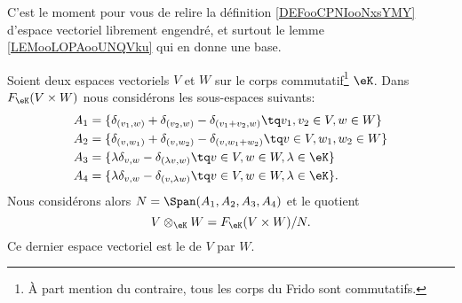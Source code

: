 C'est le moment pour vous de relire la définition \ref{DEFooCPNIooNxsYMY} d'espace vectoriel librement engendré, et surtout le lemme \ref{LEMooLOPAooUNQVku} qui en donne une base.

\begin{definition}       \label{DEFooKTVDooSPzAhH}
    Soient deux espaces vectoriels \( V\) et \( W\) sur le corps commutatif\footnote{À part mention du contraire, tous les corps du Frido sont commutatifs.} \( \eK\). Dans \( F_{\eK}(V\times W)\) nous considérons les sous-espaces suivants:
    \begin{subequations}
        \begin{align}
            A_1&=\{ \delta_{(v_1,w)}+\delta_{(v_2,w)}-\delta_{(v_1+v_2,w)}\tq v_1,v_2\in V,w\in W  \}\\
            A_2&=\{ \delta_{(v,w_1)}+\delta_{(v,w_2)}-\delta_{(v,w_1+w_2)}\tq v\in V,w_1,w_2\in W  \} \label{SUBEQooSHBJooJLPVbK} \\
            A_3&=\{ \lambda\delta_{v,w}-\delta_{(\lambda v, w)}\tq v\in V,w\in W,\lambda\in \eK \}\\
            A_4&=\{ \lambda\delta_{v,w}-\delta_{(v,\lambda w)}\tq v\in V,w\in W,\lambda\in \eK \}.
        \end{align}
    \end{subequations}
    Nous considérons alors \( N=\Span(A_1,A_2,A_3,A_4)\) et le quotient
    \begin{equation}
        V\otimes_{\eK}W=F_{\eK}(V\times W)/N.
    \end{equation}
    Ce dernier espace vectoriel est le  de \( V\) par \( W\).
\end{definition}

